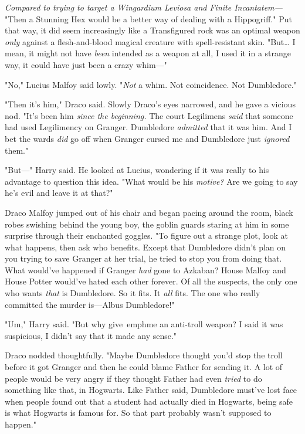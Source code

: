 \emph{Compared to trying to target a Wingardium Leviosa and Finite 
Incantatem---} "Then a Stunning Hex would be a better way of dealing with a 
Hippogriff." Put that way, it did seem increasingly like a Transfigured rock 
was an optimal weapon \emph{only} against a flesh-and-blood magical creature 
with spell-resistant skin. "But{\ldots} I mean, it might not have \emph{been} 
intended as a weapon at all, I used it in a strange way, it could have just 
been a crazy whim---"

"No," Lucius Malfoy said lowly. "\emph{Not} a whim. Not coincidence. Not 
Dumbledore."

"Then it's him," Draco said. Slowly Draco's eyes narrowed, and he gave a 
vicious nod. "It's been him \emph{since the beginning.} The court Legilimens 
\emph{said} that someone had used Legilimency on Granger. Dumbledore 
\emph{admitted} that it was him. And I bet the wards \emph{did} go off when 
Granger cursed me and Dumbledore just \emph{ignored} them."

"But---" Harry said. He looked at Lucius, wondering if it was really to his 
advantage to question this idea. "What would be his \emph{motive?} Are we going 
to say he's evil and leave it at that?"

Draco Malfoy jumped out of his chair and began pacing around the room, black 
robes swishing behind the young boy, the goblin guards staring at him in some 
surprise through their enchanted goggles. "To figure out a strange plot, look 
at what happens, then ask who benefits. Except that Dumbledore didn't plan on 
you trying to save Granger at her trial, he tried to stop you from doing that. 
What would've happened if Granger \emph{had} gone to Azkaban? House Malfoy and 
House Potter would've hated each other forever. Of all the suspects, the only 
one who wants \emph{that} is Dumbledore. So it fits. It \emph{all} fits. The 
one who really committed the murder is---Albus Dumbledore!"

"Um," Harry said. "But why give\ emph{me} an anti-troll weapon? I said it was 
suspicious, I didn't say that it made any sense."

Draco nodded thoughtfully. "Maybe Dumbledore thought you'd stop the troll 
before it got Granger and then he could blame Father for sending it. A lot of 
people would be very angry if they thought Father had even \emph{tried} to do 
something like that, in Hogwarts. Like Father said, Dumbledore must've lost 
face when people found out that a student had actually died in Hogwarts, being 
safe is what Hogwarts is famous for. So that part probably wasn't supposed to 
happen."

